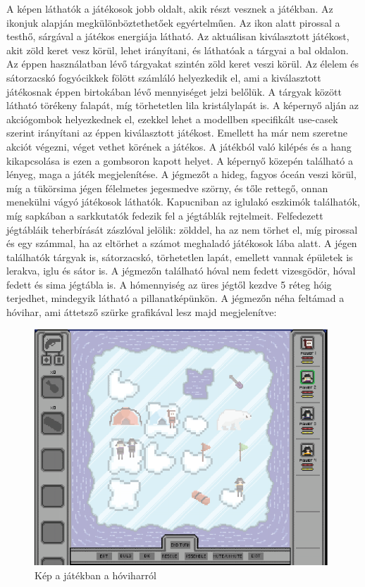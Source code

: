 A képen láthatók a játékosok jobb oldalt, akik részt vesznek a játékban. Az ikonjuk alapján megkülönböztethetőek egyértelműen. Az ikon alatt pirossal a testhő, sárgával a játékos energiája látható.
Az aktuálisan kiválasztott játékost, akit zöld keret vesz körül, lehet irányítani, és láthatóak a tárgyai a bal oldalon. Az éppen használatban lévő tárgyakat szintén zöld keret veszi körül. Az élelem és sátorzacskó fogyócikkek fölött számláló helyezkedik el, ami a kiválasztott játékosnak éppen birtokában lévő mennyiséget jelzi belőlük. A tárgyak között látható törékeny falapát, míg törhetetlen lila kristálylapát is.
A képernyő alján az akciógombok helyezkednek el, ezekkel lehet a modellben specifikált use-casek szerint irányítani az éppen kiválasztott játékost. Emellett ha már nem szeretne akciót végezni, véget vethet körének a játékos. A játékból való kilépés és a hang kikapcsolása is ezen a gombsoron kapott helyet.
A képernyő közepén található a lényeg, maga a játék megjelenítése. A jégmezőt a hideg, fagyos óceán veszi körül, míg a tükörsima jégen félelmetes jegesmedve szörny, és tőle rettegő, onnan menekülni vágyó játékosok láthatók. Kapucniban az iglulakó eszkimók találhatók, míg sapkában a sarkkutatók fedezik fel a jégtáblák rejtelmeit. Felfedezett jégtábláik teherbírását zászlóval jelölik: zölddel, ha az nem törhet el, míg pirossal és egy számmal, ha az eltörhet a számot meghaladó játékosok lába alatt.
A jégen találhatók tárgyak is, sátorzacskó, törhetetlen lapát, emellett vannak épületek is lerakva, iglu és sátor is.
A jégmezőn található hóval nem fedett vizesgödör, hóval fedett és sima jégtábla is. A hómennyiség az üres jégtől kezdve 5 réteg hóig terjedhet, mindegyik látható a pillanatképünkön.
A jégmezőn néha feltámad a hóvihar, ami áttetsző szürke grafikával lesz majd megjelenítve:

\begin{figure}[H]
	\begin{center}
		\includegraphics[width=11cm]{chapters/chapter11/res/storm.png}
		\caption{Kép a játékban a hóviharról}
		\label{fig:Snowstorm}
	\end{center}
\end{figure}

